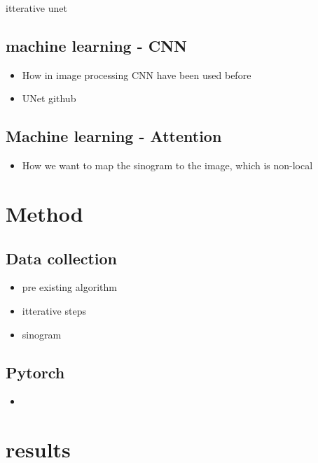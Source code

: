 \documentclass[9pt,Preprint]{lapreprint}
\begin{document}
itterative unet \parencite{ge2023mb}

\subsection{machine learning - CNN}

\begin{itemize}
\item How in image processing CNN have been used before \parencite{yamashita2018convolutional}


\item UNet github\parencite{ronneberger2015u}
\end{itemize}

\subsection{Machine learning - Attention}

\begin{itemize}
\item How we want to map the sinogram to the image, which is non-local \parencite{vaswani2017attention}
\end{itemize}

\section{Method}

\subsection{Data collection}

\begin{itemize}
\item pre existing algorithm
\item itterative steps
\item sinogram
\end{itemize}

\subsection{Pytorch}

\begin{itemize}
\item
\end{itemize}

\section{results}
\end{document}
